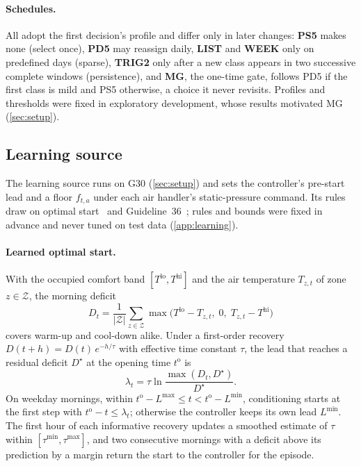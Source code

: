\documentclass{article}
\begin{document}
\paragraph{Schedules.}
All adopt the first decision's profile and differ only in later changes: \textbf{PS5} makes none (select once), \textbf{PD5} may
reassign daily, \textbf{LIST} and \textbf{WEEK} only on predefined days (sparse), \textbf{TRIG2} only
after a new class appears in two successive complete windows (persistence), and \textbf{MG}, the one-time gate, follows PD5
if the first class is mild and PS5 otherwise, a choice it never revisits. Profiles and thresholds were
fixed in exploratory development, whose results motivated MG (\cref{sec:setup}).

\subsection{Learning source}\label{sec:learning}
The learning source runs on G30 (\cref{sec:setup}) and sets the controller's pre-start lead
and a floor $f_{t,a}$ under each air handler's static-pressure command. Its rules draw on optimal
start~\cite{seem2016return,kim2024optimalstart} and Guideline~36~\cite{ashrae2021g36}; rules and bounds were fixed in advance and never tuned on test data (\cref{app:learning}).

\paragraph{Learned optimal start.}
With the occupied comfort band $[T^{\mathrm{lo}}, T^{\mathrm{hi}}]$ and the air temperature $T_{z,t}$ of zone
$z \in \mathcal Z$, the morning deficit
\begin{equation}
  D_t = \frac{1}{|\mathcal Z|}\sum_{z\in\mathcal Z} \max\bigl(T^{\mathrm{lo}} - T_{z,t},\; 0,\; T_{z,t} - T^{\mathrm{hi}}\bigr)
  \label{eq:deficit}
\end{equation}
covers warm-up and cool-down alike. Under a first-order recovery $D(t+h) = D(t)\,e^{-h/\tau}$ with effective time constant
$\tau$, the lead that reaches a residual deficit $D^\star$ at the opening time $t^{\mathrm{o}}$ is
\begin{equation}
  \lambda_t = \tau \ln\frac{\max(D_t, D^\star)}{D^\star}.
  \label{eq:lead}
\end{equation}
On weekday mornings, within $t^{\mathrm{o}} - L^{\max} \le t < t^{\mathrm{o}} - L^{\min}$, conditioning starts at the first
step with $t^{\mathrm{o}} - t \le \lambda_t$; otherwise the controller keeps its own lead $L^{\min}$. The first hour of
each informative recovery updates a smoothed estimate of $\tau$ within $[\tau^{\min}, \tau^{\max}]$, and two consecutive mornings with a deficit above its
prediction by a margin return the start to the controller for the episode.
\end{document}
